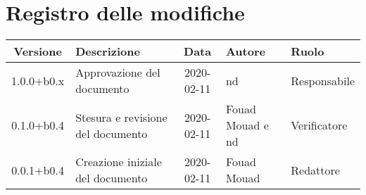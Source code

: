 \section*{Registro delle modifiche}

\begin{center}
	\begin{longtable}{|c|p{3.5cm}|c|p{3cm}|p{3cm}|}
	\hline
	\rowcolor{lighter-grayer}
	\textbf{Versione} & \textbf{Descrizione} & \textbf{Data} & \textbf{Autore} & \textbf{Ruolo} \\
	\hline
	\endfirsthead


	1.0.0+b0.x & Approvazione del documento & 2020-02-11 & nd & Responsabile \\
	\hline
	0.1.0+b0.4 & Stesura e revisione del documento & 2020-02-11 & Fouad Mouad e nd & Verificatore \\
	\hline
	0.0.1+b0.4 & Creazione iniziale del documento & 2020-02-11 & Fouad Mouad & Redattore \\
	\hline

	\end{longtable}
\end{center}